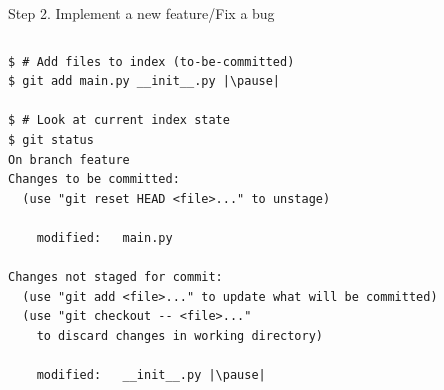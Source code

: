 \begin{frame}[fragile]{Step 2. Implement a new feature/Fix a bug}
\begin{columns}
	\begin{column}{0.6\textwidth}
	\begin{lstlisting}
$ # Add files to index (to-be-committed)
$ git add main.py __init__.py |\pause|

$ # Look at current index state
$ git status
On branch feature
Changes to be committed:
  (use "git reset HEAD <file>..." to unstage)

	modified:   main.py

Changes not staged for commit:
  (use "git add <file>..." to update what will be committed)
  (use "git checkout -- <file>..." 
	to discard changes in working directory)

	modified:   __init__.py |\pause|


\end{lstlisting}
\end{column}
\end{columns}
\end{frame}

